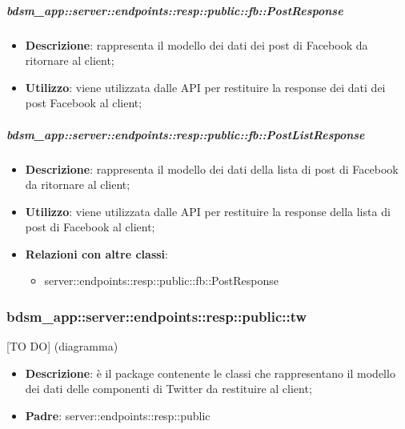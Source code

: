     \subparagraph{bdsm\_app::server::endpoints::resp::public::fb::PostResponse} %
    \label{subp:bdsm_app_server_endpoints_resp_public_fb_postresponse}
    \begin{itemize}
      \item \textbf{Descrizione}: rappresenta il modello dei dati dei post di Facebook da ritornare al client;
      \item \textbf{Utilizzo}: viene utilizzata dalle API per restituire la response dei dati dei post Facebook al client;
      \end{itemize}

    \subparagraph{bdsm\_app::server::endpoints::resp::public::fb::PostListResponse} %
    \label{subp:bdsm_app_server_endpoints_resp_public_fb_postlistresponse}
    \begin{itemize}
      \item \textbf{Descrizione}: rappresenta il modello dei dati della lista di post di Facebook da ritornare al client;
      \item \textbf{Utilizzo}: viene utilizzata dalle API per restituire la response della lista di post di Facebook al client;
      \item \textbf{Relazioni con altre classi}:
        \begin{itemize}
          \item server::endpoints::resp::public::fb::PostResponse
        \end{itemize}
      \end{itemize}

\subsubsection{bdsm\_app::server::endpoints::resp::public::tw} %
\label{ssub:bdsm_app_server_endpoints_resp_public_tw}
[TO DO] (diagramma) \newline \newline

\begin{itemize}
  \item \textbf{Descrizione}: è il package contenente le classi che rappresentano il modello dei dati delle componenti di Twitter da restituire al client;
  \item \textbf{Padre}: server::endpoints::resp::public
\end{itemize}

